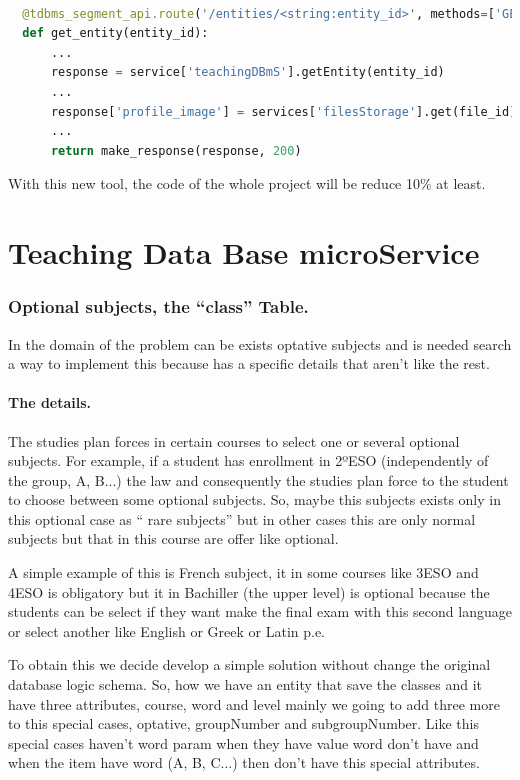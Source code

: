 \begin{lstlisting}[language=python,frame=none]

  @tdbms_segment_api.route('/entities/<string:entity_id>', methods=['GET'])
  def get_entity(entity_id):
      ...
      response = service['teachingDBmS'].getEntity(entity_id)
      ...
      response['profile_image'] = services['filesStorage'].get(file_id)
      ...
      return make_response(response, 200)
\end{lstlisting}

\noindent With this new tool, the code of the whole project will be reduce 10\% at least.

\section{Teaching Data Base microService}

\subsubsection{Optional subjects, the ``class'' Table.}

In the domain of the problem can be exists optative subjects and is
needed search a way to implement this because has a specific details
that aren't like the rest.

\paragraph{The details.}

The studies plan forces in certain courses to select one or several
optional subjects. For example, if a student has enrollment in 2ºESO
(independently of the group, A, B...) the law and consequently the
studies plan force to the student to choose between some optional
subjects. So, maybe this subjects exists only in this optional case
as `` rare subjects'' but in other cases this are only normal subjects
but that in this course are offer like optional.

A simple example of this is French subject, it in some courses like
3ESO and 4ESO is obligatory but it in Bachiller (the upper level)
is optional because the students can be select if they want make the
final exam with this second language or select another like English
or Greek or Latin p.e.

To obtain this we decide develop a simple solution without change
the original database logic schema. So, how we have an entity that
save the classes and it have three attributes, course, word and level
mainly we going to add three more to this special cases, optative,
groupNumber and subgroupNumber. Like this special cases haven't word
param when they have value word don't have and when the item have
word (A, B, C...) then don't have this special attributes.

